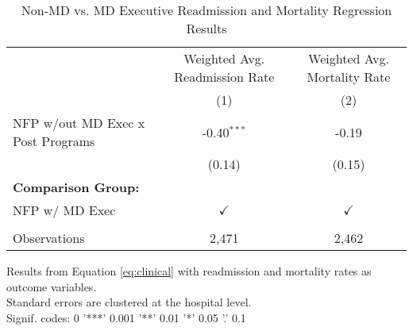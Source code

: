 \begin{table}[ht!]
   \caption{\label{tab:MD_noMD_readmort_fullsample} Non-MD vs. MD Executive Readmission and Mortality Regression Results}
   \bigskip
   \centering
   \begin{tabular}{lcc}
      \toprule
                                        & Weighted Avg. Readmission Rate & Weighted Avg. Mortality Rate\\  
                                        & (1)                            & (2)\\  
      \midrule 
      NFP w/out MD Exec x Post Programs & -0.40$^{***}$                  & -0.19\\   
                                        & (0.14)                         & (0.15)\\   
      \textbf{Comparison Group:}        &                                & \\  
      NFP w/ MD Exec                    & $\checkmark$                   & $\checkmark$\\   
       \\
      Observations                      & 2,471                          & 2,462\\  
      \bottomrule
   \end{tabular}
   
   \par \raggedright 
   Results from Equation \ref{eq:clinical} with readmission and mortality rates as outcome variables.\\
   Standard errors are clustered at the hospital level.\\
   Signif. codes: 0 '***' 0.001 '**' 0.01 '*' 0.05 '.' 0.1
\end{table}
